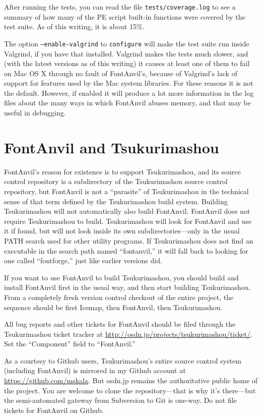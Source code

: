 After running the tests, you can read the file \texttt{tests/coverage.log}
to see a summary of how many of the PE script built-in functions were
covered by the test suite.  As of this writing, it is about 15\%.

The option \texttt{--enable-valgrind} to \texttt{configure} will make the
test suite run inside Valgrind, if you have that installed.  Valgrind
makes the tests much slower, and (with the latest versions as of this
writing) it causes at least one of them to fail on Mac OS X through no fault
of FontAnvil's, because of Valgrind's lack of support for features used by
the Mac system libraries.  For these reasons it is not the default. 
However, if enabled it will produce a lot more information in the log files
about the many ways in which FontAnvil abuses memory, and that may be useful
in debugging.

\section{FontAnvil and Tsukurimashou}

FontAnvil's reason for existence is to support Tsukurimashou, and its source
control repository is a subdirectory of the Tsukurimashou source control
repository, but FontAnvil is not a ``parasite'' of Tsukurimashou in the
technical sense of that term defined by the Tsukurimashou build system. 
Building Tsukurimashou will not automatically also build FontAnvil.
FontAnvil does not require Tsukurimashou to build.  Tsukurimashou will look
for FontAnvil and use it if found, but will not look inside its own
subdirectories---only in the usual PATH search used for other utility
programs.  If Tsukurimashou does not find an executable in the search path
named ``fontanvil,'' it will fall back to looking for one called
``fontforge,'' just like earlier versions did.

If you want to use FontAnvil to build Tsukurimashou, you should build and
install FontAnvil first in the usual way, and then start building
Tsukurimashou.  From a completely fresh version control checkout of the
entire project, the sequence should be first Icemap, then FontAnvil, then
Tsukurimashou.

All bug reports and other tickets for FontAnvil should be filed through
the Tsukurimashou ticket tracker at
\url{http://osdn.jp/projects/tsukurimashou/ticket/}.  Set the
``Component'' field to ``FontAnvil.''

As a courtesy to Github users, Tsukurimashou's entire source control system
(including FontAnvil) is mirrored in my Github account at
\url{https://github.com/mskala}.  But osdn.jp remains the
authoritative public home of the project.  You are welcome to clone the
repository---that is why it's there---but the semi-automated gateway from
Subversion to Git is one-way.  Do not file tickets for FontAnvil on Github.

\clearpage

